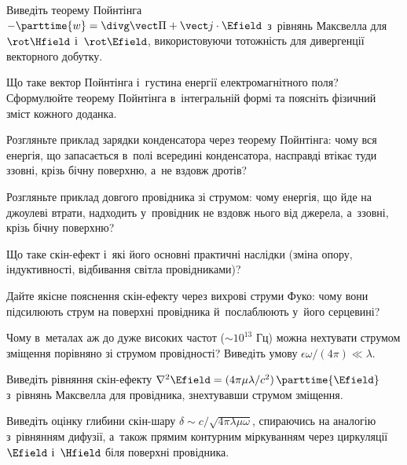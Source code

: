 \begin{Questions}
\begin{quizlist}
		\item Виведіть теорему Пойнтінга $-\parttime{w} = \divg\vect\Pi + \vect
		  j\cdot\Efield$ з~рівнянь Максвелла для $\rot\Hfield$ і~$\rot\Efield$,
		  використовуючи тотожність для дивергенції векторного добутку.
		
		\item Що таке вектор Пойнтінга і~густина енергії електромагнітного поля?
		  Сформулюйте теорему Пойнтінга в~інтегральній формі та поясніть фізичний зміст
		  кожного доданка.
		
		\item Розгляньте приклад зарядки конденсатора через теорему Пойнтінга: чому вся
		  енергія, що запасається в~полі всередині конденсатора, насправді втікає туди
		  ззовні, крізь бічну поверхню, а~не вздовж дротів?
		
		\item Розгляньте приклад довгого провідника зі струмом: чому енергія, що йде на
		  джоулеві втрати, надходить у~провідник не вздовж нього від джерела, а~ззовні,
		  крізь бічну поверхню?
		
		\item Що таке скін-ефект і~які його основні практичні наслідки (зміна опору,
		  індуктивності, відбивання світла провідниками)?
		
		\item Дайте якісне пояснення скін-ефекту через вихрові струми Фуко: чому вони
		  підсилюють струм на поверхні провідника й~послаблюють у~його серцевині?
		
		\item Чому в~металах аж до дуже високих частот ($\sim10^{13}$ Гц) можна нехтувати
		  струмом зміщення порівняно зі струмом провідності? Виведіть умову
		  $\epsilon\omega/(4\pi) \ll \lambda$.
		
		\item Виведіть рівняння скін-ефекту $\nabla^2\Efield =
		  (4\pi\mu\lambda/c^2)\,\parttime{\Efield}$ з~рівнянь Максвелла для провідника,
		  знехтувавши струмом зміщення.
		
		\item Виведіть оцінку глибини скін-шару $\delta \sim c/\sqrt{4\pi\lambda\mu\omega}$, спираючись на аналогію з~рівнянням дифузії, а~також прямим контурним міркуванням через циркуляції $\Efield$ і~$\Hfield$ біля поверхні провідника.
		

\end{quizlist}
\end{Questions}
